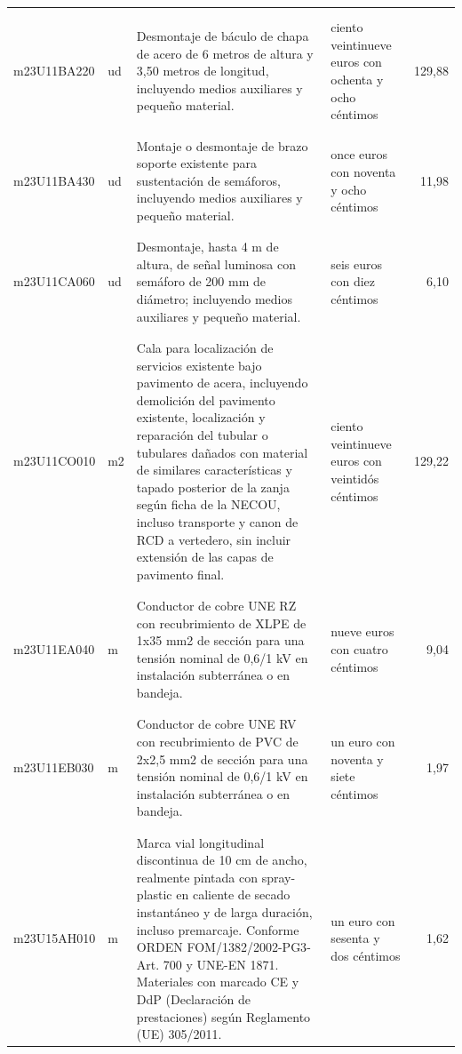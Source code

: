 \documentclass{book}%
\begin{document}
\begin{longtable}{|l|l|p{5cm}|p{3cm}|r|}
&&&&\\%
&&&&\\%
m23U11BA220&ud&Desmontaje de báculo de chapa de acero de 6 metros de altura y 3,50 metros de longitud, incluyendo medios auxiliares y pequeño material.&ciento veintinueve euros con ochenta y ocho céntimos&129,88\\%
&&&&\\%
&&&&\\%
m23U11BA430&ud&Montaje o desmontaje de brazo soporte existente para sustentación de semáforos, incluyendo medios auxiliares y pequeño material.&once euros con noventa y ocho céntimos&11,98\\%
&&&&\\%
&&&&\\%
m23U11CA060&ud&Desmontaje, hasta 4 m de altura, de señal luminosa con semáforo de 200 mm de diámetro; incluyendo medios auxiliares y pequeño material.&seis euros con diez céntimos&6,10\\%
&&&&\\%
&&&&\\%
m23U11CO010&m2&Cala para localización de servicios existente bajo pavimento de acera, incluyendo demolición del pavimento existente, localización y reparación del tubular o tubulares dañados con material de similares características y tapado posterior de la zanja según ficha de la NECOU, incluso transporte y canon de RCD a vertedero, sin incluir extensión de las capas de pavimento final.&ciento veintinueve euros con veintidós céntimos&129,22\\%
&&&&\\%
&&&&\\%
m23U11EA040&m&Conductor de cobre UNE RZ con recubrimiento de XLPE de 1x35 mm2 de sección para una tensión nominal de 0,6/1 kV en instalación subterránea o en bandeja.&nueve euros con cuatro céntimos&9,04\\%
&&&&\\%
&&&&\\%
m23U11EB030&m&Conductor de cobre UNE RV con recubrimiento de PVC de 2x2,5 mm2 de sección para una tensión nominal de 0,6/1 kV en instalación subterránea o en bandeja.&un euro con noventa y siete céntimos&1,97\\%
&&&&\\%
&&&&\\%
m23U15AH010&m&Marca vial longitudinal discontinua de 10 cm de ancho, realmente pintada con spray{-}plastic en caliente de secado instantáneo y de larga duración, incluso premarcaje. Conforme ORDEN FOM/1382/2002{-}PG3{-}Art. 700 y UNE{-}EN 1871. Materiales con marcado CE y DdP (Declaración de prestaciones) según Reglamento (UE) 305/2011.&un euro con sesenta y dos céntimos&1,62\\%

\end{longtable}
\end{document}
